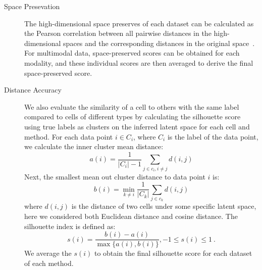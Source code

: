 \begin{description} %
	\item[Space Presevation] The high-dimensional space preserves of each dataset can be calculated as the Pearson correlation between all pairwise distances in the high-dimensional spaces and the corresponding distances in the original space~\citep{jain2021multimap}. For multimodal data, space-preserved scores can be obtained for each modality, and these individual scores are then averaged to derive the final space-preserved score.


	\item[Distance Accuracy] 
    We also evaluate the similarity of a cell to others with the same label compared to cells of different types by calculating the silhouette score~\citep{rousseeuw1987silhouettes} using true labels as clusters on the inferred latent space for each cell and method. For each data point $i\in C_i$, where $C_i$ is the label of the data point, we calculate the inner cluster mean distance:
	\begin{equation}
	  a(i) = \frac{1}{|C_i| - 1} \underset{j \in c_i, i\neq j}{\sum} d(i, j)
	\end{equation}
	Next, the smallest mean out cluster distance to data point $i$ is:
	\begin{equation}
	b(i) = \underset{k\neq i}{\min}\frac{1}{|C_k|}\underset{j\in c_k}{\sum} d(i,j)
	\end{equation}
    where $d(i,j)$ is the distance of two cells under some specific latent space, here we considered both Euclidean distance and cosine distance. The silhouette index is defined as:
	\begin{equation}
	s(i)=\frac{b(i)-a(i)}{\max\{a(i), b(i)\}}, -1\leq s(i) \leq 1\ .
	\end{equation}
    We average the $s(i)$ to obtain the final silhouette score for each dataset of each method.


\end{description}
